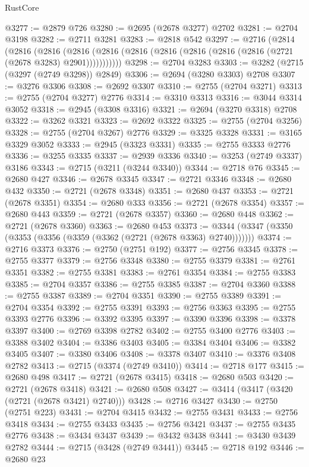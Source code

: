 \begin{lexlean}{RustCore}
\begin{coremodule}
@3277 := @2879 @726
@3280 := @2695 (@2678 @3277) @2702
@3281 := @2704 @3198
@3282 := @2711 @3281
@3283 := @2818 @542
@3297 := @2716
    (@2814
      (@2816
        (@2816
          (@2816 (@2816 (@2816 (@2816 (@2816 (@2816 (@2816 (@2721 (@2678 @3283) @2901)))))))))))
@3298 := @2704 @3283
@3303 := @3282 (@2715 (@3297 (@2749 @3298)) @2849)
@3306 := @2694 (@3280 @3303) @2708
@3307 := @3276 @3306
@3308 := @2692 @3307
@3310 := @2755 (@2704 @3271)
@3313 := @2755 (@2704 @3277) @2776
@3314 := @3310 @3313
@3316 := @3044 @3314 @3052
@3318 := @2945 (@3308 @3316)
@3321 := @2694 (@3270 @3318) @2708
@3322 := @3262 @3321
@3323 := @2692 @3322
@3325 := @2755 (@2704 @3256)
@3328 := @2755 (@2704 @3267) @2776
@3329 := @3325 @3328
@3331 := @3165 @3329 @3052
@3333 := @2945 (@3323 @3331)
@3335 := @2755 @3333 @2776
@3336 := @3255 @3335
@3337 := @2939 @3336
@3340 := @3253 (@2749 @3337) @3186
@3343 := @2715 (@3211 (@3244 @3340))
@3344 := @2718 @76
@3345 := @2680 @427
@3346 := @2678 @3345
@3347 := @2721 @3346
@3348 := @2680 @432
@3350 := @2721 (@2678 @3348)
@3351 := @2680 @437
@3353 := @2721 (@2678 @3351)
@3354 := @2680 @333
@3356 := @2721 (@2678 @3354)
@3357 := @2680 @443
@3359 := @2721 (@2678 @3357)
@3360 := @2680 @448
@3362 := @2721 (@2678 @3360)
@3363 := @2680 @453
@3373 := @3344 (@3347 (@3350 (@3353 (@3356 (@3359 (@3362 (@2721 (@2678 @3363) @2740)))))))
@3374 := @2716 @3373
@3376 := @2750 (@2751 @192)
@3377 := @2756 @3345
@3378 := @2755 @3377
@3379 := @2756 @3348
@3380 := @2755 @3379
@3381 := @2761 @3351
@3382 := @2755 @3381
@3383 := @2761 @3354
@3384 := @2755 @3383
@3385 := @2704 @3357
@3386 := @2755 @3385
@3387 := @2704 @3360
@3388 := @2755 @3387
@3389 := @2704 @3351
@3390 := @2755 @3389
@3391 := @2704 @3354
@3392 := @2755 @3391
@3393 := @2756 @3363
@3395 := @2755 @3393 @2776
@3396 := @3392 @3395
@3397 := @3390 @3396
@3398 := @3378 @3397
@3400 := @2769 @3398 @2782
@3402 := @2755 @3400 @2776
@3403 := @3388 @3402
@3404 := @3386 @3403
@3405 := @3384 @3404
@3406 := @3382 @3405
@3407 := @3380 @3406
@3408 := @3378 @3407
@3410 := @3376 @3408 @2782
@3413 := @2715 (@3374 (@2749 @3410))
@3414 := @2718 @177
@3415 := @2680 @498
@3417 := @2721 (@2678 @3415)
@3418 := @2680 @503
@3420 := @2721 (@2678 @3418)
@3421 := @2680 @508
@3427 := @3414 (@3417 (@3420 (@2721 (@2678 @3421) @2740)))
@3428 := @2716 @3427
@3430 := @2750 (@2751 @223)
@3431 := @2704 @3415
@3432 := @2755 @3431
@3433 := @2756 @3418
@3434 := @2755 @3433
@3435 := @2756 @3421
@3437 := @2755 @3435 @2776
@3438 := @3434 @3437
@3439 := @3432 @3438
@3441 := @3430 @3439 @2782
@3444 := @2715 (@3428 (@2749 @3441))
@3445 := @2718 @192
@3446 := @2680 @23

\end{coremodule}
\end{lexlean}
